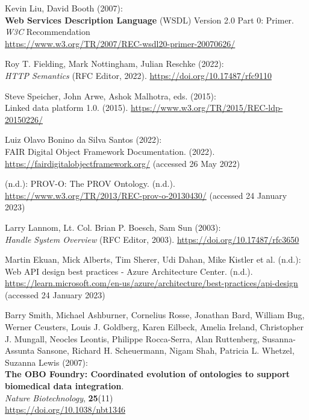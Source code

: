 \begin{thebibliography}{9}
Kevin Liu, David Booth (2007): \\
\textbf{Web Services Description Language} (WSDL) Version 2.0
Part 0: Primer. \\
\emph{W3C} Recommendation \\
\url{https://www.w3.org/TR/2007/REC-wsdl20-primer-20070626/}

Roy T. Fielding, Mark Nottingham, Julian Reschke (2022): \\
\emph{{HTTP Semantics}} ({RFC Editor}, 2022).
\url{https://doi.org/10.17487/rfc9110}

Steve Speicher, John Arwe, Ashok Malhotra, eds. (2015): \\
Linked data
platform 1.0. (2015). \url{https://www.w3.org/TR/2015/REC-ldp-20150226/}

Luiz Olavo Bonino da Silva Santos (2022): \\
{FAIR Digital Object Framework
Documentation}. (2022). \url{https://fairdigitalobjectframework.org/}
(accessed 26 May 2022)

(n.d.): {PROV-O}: {The PROV Ontology}. (n.d.).
\url{https://www.w3.org/TR/2013/REC-prov-o-20130430/} (accessed 24
January 2023)

Larry Lannom, Lt. Col. Brian P. Boesch, Sam Sun (2003): \\
\emph{Handle
{System Overview}} ({RFC Editor}, 2003).
\url{https://doi.org/10.17487/rfc3650}

Martin Ekuan, Mick Alberts, Tim Sherer, Udi Dahan, Mike Kistler et
al. (n.d.): Web {API} design best practices - {Azure Architecture
Center}. (n.d.).
\url{https://learn.microsoft.com/en-us/azure/architecture/best-practices/api-design}
(accessed 24 January 2023)

Barry Smith, Michael Ashburner, Cornelius Rosse, Jonathan Bard, William
Bug, Werner Ceusters, Louis J. Goldberg, Karen Eilbeck, Amelia Ireland,
Christopher J. Mungall, Neocles Leontis, Philippe Rocca-Serra, Alan
Ruttenberg, Susanna-Assunta Sansone, Richard H. Scheuermann, Nigam Shah,
Patricia L. Whetzel, Suzanna Lewis (2007): \\
\textbf{The {OBO Foundry}:
Coordinated evolution of ontologies to support biomedical data
integration}. \\
\emph{Nature Biotechnology}, \textbf{25}(11) \\
\url{https://doi.org/10.1038/nbt1346}


\end{thebibliography}
